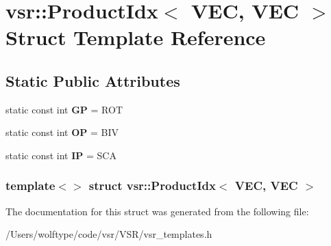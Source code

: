 \hypertarget{structvsr_1_1_product_idx_3_01_v_e_c_00_01_v_e_c_01_4}{\section{vsr\-:\-:Product\-Idx$<$ V\-E\-C, V\-E\-C $>$ Struct Template Reference}
\label{structvsr_1_1_product_idx_3_01_v_e_c_00_01_v_e_c_01_4}
}
\subsection*{Static Public Attributes}
\begin{DoxyCompactItemize}
\item 
\hypertarget{structvsr_1_1_product_idx_3_01_v_e_c_00_01_v_e_c_01_4_a1dca9941762d9bb8e97cb77e501655a3}{static const int {\bfseries G\-P} = R\-O\-T}\label{structvsr_1_1_product_idx_3_01_v_e_c_00_01_v_e_c_01_4_a1dca9941762d9bb8e97cb77e501655a3}

\item 
\hypertarget{structvsr_1_1_product_idx_3_01_v_e_c_00_01_v_e_c_01_4_ad1f521640a288767792078347c00ccff}{static const int {\bfseries O\-P} = B\-I\-V}\label{structvsr_1_1_product_idx_3_01_v_e_c_00_01_v_e_c_01_4_ad1f521640a288767792078347c00ccff}

\item 
\hypertarget{structvsr_1_1_product_idx_3_01_v_e_c_00_01_v_e_c_01_4_af208768b72d30c34793c8c93d1c5cbf8}{static const int {\bfseries I\-P} = S\-C\-A}\label{structvsr_1_1_product_idx_3_01_v_e_c_00_01_v_e_c_01_4_af208768b72d30c34793c8c93d1c5cbf8}

\end{DoxyCompactItemize}
\subsubsection*{template$<$$>$ struct vsr\-::\-Product\-Idx$<$ V\-E\-C, V\-E\-C $>$}



The documentation for this struct was generated from the following file\-:\begin{DoxyCompactItemize}
\item 
/\-Users/wolftype/code/vsr/\-V\-S\-R/vsr\-\_\-templates.\-h\end{DoxyCompactItemize}
